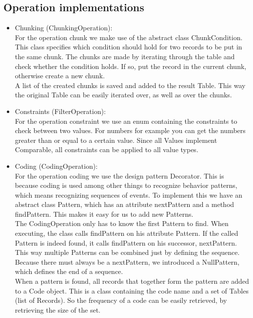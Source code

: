 \documentclass[11pt,twoside,a4paper]{article}
\begin{document}
\subsection{Operation implementations}

\begin{itemize}

\item Chunking (ChunkingOperation):\\
For the operation chunk we make use of the abstract class ChunkCondition. This class specifies which condition should hold for two records to be put in the same chunk. The chunks are made by iterating through the table and check whether the condition holds. If so, put the record in the current chunk, otherwise create a new chunk.\\
A list of the created chunks is saved and added to the result Table. This way the original Table can be easily iterated over, as well as over the chunks.

\item Constraints (FilterOperation):\\
For the operation constraint we use an enum containing the constraints to check between two values. For numbers for example you can get the numbers greater than or equal to a certain value. Since all Values implement Comparable, all constraints can be applied to all value types.

\item Coding (CodingOperation):\\
For the operation coding we use the design pattern Decorator. This is because coding is used among other things to recognize behavior patterns, which means recognizing sequences of events. To implement this we have an abstract class Pattern, which has an attribute nextPattern and a method findPattern. This makes it easy for us to add new Patterns.\\
The CodingOperation only has to know the first Pattern to find. When executing, the class calls findPattern on his attribute Pattern. If the called Pattern is indeed found, it calls findPattern on his successor, nextPattern. This way multiple Patterns can be combined just by defining the sequence. Because there must always be a nextPattern, we introduced a NullPattern, which defines the end of a sequence.\\ 
When a pattern is found, all records that together form the pattern are added to a Code object. This is a class containing the code name and a set of Tables (list of Records). So the frequency of a code can be easily retrieved, by retrieving the size of the set.


\end{itemize}
\end{document}
